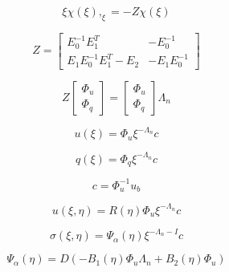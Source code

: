 \begin{equation}
    \xi \chi(\xi),_{\xi} = -Z\chi(\xi)
    \label{lr_eq:sbfem_1stODE}
\end{equation}

\begin{equation}
    Z = \begin{bmatrix}
        E_0^{-1} E_1^T    &  -E_0^{-1}   \\
        E_1 E_0^{-1} E_1^T - E_2    &   -E_1 E_0^{-1}
    \end{bmatrix}
    \label{lr_eq:sbfem_zmatrix}
\end{equation}

\begin{equation}
    Z \begin{bmatrix}
        \Phi_u \\
        \Phi_q
    \end{bmatrix} = \begin{bmatrix}
        \Phi_u  \\
        \Phi_q
    \end{bmatrix} \Lambda_n
    \label{lr_eq:sbfem_eigen_decomp}
\end{equation}

\begin{equation}
    u(\xi) = \Phi_u \xi^{-\Lambda_n} c
    \label{lr_eq:sbfem_general_sol_disp}
\end{equation}

\begin{equation}
    q(\xi) = \Phi_q \xi^{-\Lambda_n} c
    \label{lr_eq:sbfem_general_sol_str}
\end{equation}

\begin{equation}
    c = \Phi_u^{-1} u_b
    \label{lr_eq:sbfem_int_constant}
\end{equation}

\begin{equation}
    u(\xi,\eta) = R(\eta) \Phi_u \xi ^{-\Lambda_n} c
    \label{lr_eq:sbfem_displacement_field}
\end{equation}

\begin{equation}
    \sigma(\xi,\eta) = \Psi_\alpha (\eta) \xi^{-\Lambda_n - I} c
    \label{lr_eq:sbfem_stress_field}
\end{equation}

\begin{equation}
    \Psi_\alpha(\eta) = D(-B_1(\eta)\Phi_u \Lambda_n + B_2(\eta)\Phi_u)
    \label{lr_eq:sbfem_stress_mode}
\end{equation}

